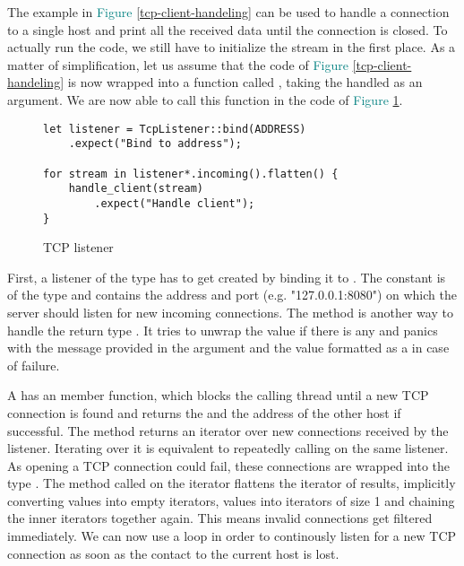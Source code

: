 The example in \textcolor{teal}{Figure \ref{tcp-client-handeling}} can be used to handle a connection to a single host
and print all the received data until the connection is closed. To actually run the code, we still have to initialize
the stream in the first place. As a matter of simplification, let us assume that the code of
\textcolor{teal}{Figure \ref{tcp-client-handeling}} is now wrapped into a function called , taking
the handled  as an argument. We are now able to call this function in the code of
\textcolor{teal}{Figure \ref{tcp-listener}}.

\begin{figure}[ht]
    \begin{verbatim}
let listener = TcpListener::bind(ADDRESS)
    .expect("Bind to address");

for stream in listener*.incoming().flatten() {
    handle_client(stream)
        .expect("Handle client");
}
    \end{verbatim}
    \caption{TCP listener}
    \label{tcp-listener}
\end{figure}

First, a listener of the type  has to get created by binding it to . The
constant  is of the type  and contains the address and port (e.g. "127.0.0.1:8080") on which
the server should listen for new incoming connections. The method  is another way to handle the return
type . It tries to unwrap the  value if there is any and panics with the message provided in the
argument and the  value formatted as a  in case of failure.

A  has an  member function, which blocks the calling thread until a new TCP connection
is found and returns the  and the address of the other host if successful. The method 
returns an iterator over new connections received by the listener. Iterating over it is equivalent to repeatedly
calling  on the same listener. As opening a TCP connection could fail, these connections are wrapped into
the type . The method  called on the iterator flattens the iterator of results, implicitly
converting  values into empty iterators,  values into iterators of size 1 and chaining the inner
iterators together again. This means invalid connections get filtered immediately. We can now use a  loop in
order to continously listen for a new TCP connection as soon as the contact to the current host is lost.

